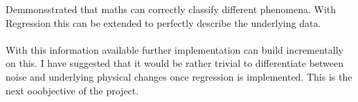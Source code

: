 \documentclass[main.tex]{subfiles}
\begin{document}
  
  
  
  Demmonsstrated that maths can correctly classify different phenomena. With Regression this can be extended to perfectly describe the underlying data.
  \\\\
  With this information available further implementation can build incrementally on this. I have suggested that it would be rather trivial to differentiate between noise and underlying physical changes once regression is implemented. This is the next ooobjective of the project.
\end{document}
